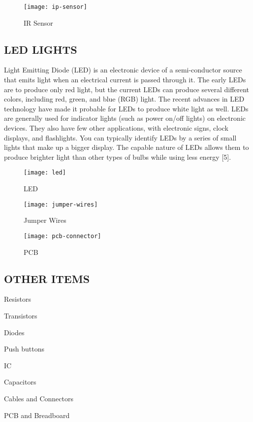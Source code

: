 \documentclass[conference]{IEEEtran}
\begin{document}
    \begin{figure}[htbp]
        \centerline{\texttt{[image: ip-sensor]}}
        \caption{IR Sensor}
        \label{fig}
    \end{figure}


    \subsection{LED LIGHTS}
    \paragraphA Light Emitting Diode (LED) is an electronic device of a
    semi-conductor source that emits light when an electrical
    current is passed through it. The early LEDs are to produce
    only red light, but the current LEDs can produce several
    different colors, including red, green, and blue (RGB) light.
    The recent advances in LED technology have made it
    probable for LEDs to produce white light as well. LEDs are
    generally used for indicator lights (such as power on/off
    lights) on electronic devices. They also have few other
    applications, with electronic signs, clock displays, and
    flashlights. You can typically identify LEDs by a series of small lights that make up a bigger display. The capable
    nature of LEDs allows them to produce brighter light than
    other types of bulbs while using less energy [5].

    \begin{figure}[htbp]
        \centerline{\texttt{[image: led]}}
        \caption{LED}
        \label{fig}
    \end{figure}

    \begin{figure}[htbp]
        \centerline{\texttt{[image: jumper-wires]}}
        \caption{Jumper Wires}
        \label{fig}
    \end{figure}

    \begin{figure}[htbp]
        \centerline{\texttt{[image: pcb-connector]}}
        \caption{PCB}
        \label{fig}
    \end{figure}
    \subsection{OTHER ITEMS}
    \itemize
    \item Resistors
    \item Transistors
    \item Diodes
    \item Push buttons
    \item IC
    \item Capacitors
    \item Cables and Connectors
    \item PCB and Breadboard
    \enditemize
\end{document}
